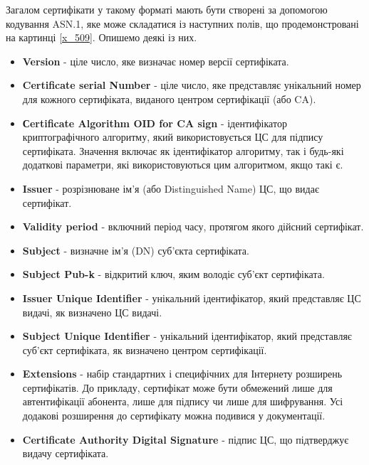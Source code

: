 Загалом сертифікати у такому форматі мають бути створені за допомогою кодування ASN.1, яке може  складатися із наступних полів, що продемонстровані на картинці \ref{x_509}. Опишемо деякі із них.
\begin{itemize}
    \item \textbf{Version} - ціле число, яке визначає номер версії сертифіката.
    \item \textbf{Certificate serial Number} - ціле число, яке представляє унікальний номер для кожного сертифіката, виданого центром сертифікації (або CA).
    \item \textbf{Сertificate Algorithm OID for CA sign} - ідентифікатор криптографічного алгоритму, який використовується ЦС для підпису сертифіката. Значення включає як ідентифікатор алгоритму, так і будь-які додаткові параметри, які використовуються цим алгоритмом, якщо такі є.
    \item \textbf{Issuer} - розрізнюване ім’я (або Distinguished Name) ЦС, що видає сертифікат.
    \item \textbf{Validity period} - включний період часу, протягом якого дійсний сертифікат.
    \item \textbf{Subject} - визначне ім'я (DN) суб'єкта сертифіката.
    \item \textbf{Subject Pub-k} - відкритий ключ, яким володіє суб’єкт сертифіката.
    \item \textbf{Issuer Unique Identifier} - унікальний ідентифікатор, який представляє ЦС видачі, як визначено ЦС видачі.
    \item \textbf{Subject Unique Identifier} - унікальний ідентифікатор, який представляє суб’єкт сертифіката, як визначено центром сертифікації.
    \item \textbf{Extensions} - набір стандартних і специфічних для Інтернету розширень сертифікатів. До прикладу, сертифікат може бути обмежений лише для автентифікації абонента, лише для підпису чи лише для шифрування. Усі додакові розширення до сертифікату можна подивися у документації. 
    \item \textbf{Certificate Authority Digital Signature} - підпис ЦС, що підтверджує видачу сертифіката.
\end{itemize}

